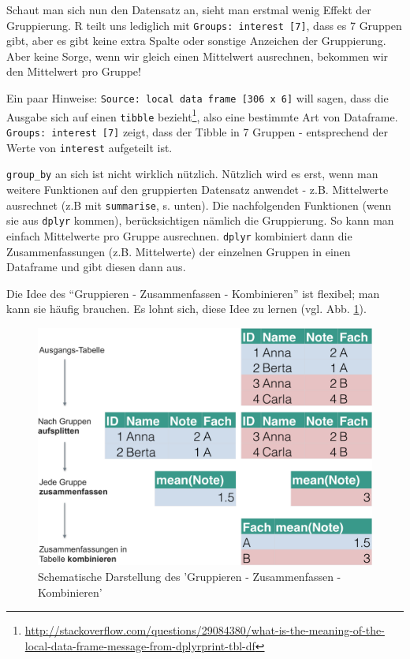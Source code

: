 \documentclass[12pt,ngerman,]{book}
\let\rmarkdownfootnote\footnote%
\def\footnote{\protect\rmarkdownfootnote}
\begin{document}
Schaut man sich nun den Datensatz an, sieht man erstmal wenig Effekt der
Gruppierung. R teilt uns lediglich mit
\texttt{Groups:\ interest\ {[}7{]}}, dass es 7 Gruppen gibt, aber es
gibt keine extra Spalte oder sonstige Anzeichen der Gruppierung. Aber
keine Sorge, wenn wir gleich einen Mittelwert ausrechnen, bekommen wir
den Mittelwert pro Gruppe!

Ein paar Hinweise: \texttt{Source:\ local\ data\ frame\ {[}306\ x\ 6{]}}
will sagen, dass die Ausgabe sich auf einen \texttt{tibble}
bezieht\footnote{\url{http://stackoverflow.com/questions/29084380/what-is-the-meaning-of-the-local-data-frame-message-from-dplyrprint-tbl-df}},
also eine bestimmte Art von Dataframe.
\texttt{Groups:\ interest\ {[}7{]}} zeigt, dass der Tibble in 7 Gruppen
- entsprechend der Werte von \texttt{interest} aufgeteilt ist.

\texttt{group\_by} an sich ist nicht wirklich nützlich. Nützlich wird es
erst, wenn man weitere Funktionen auf den gruppierten Datensatz anwendet
- z.B. Mittelwerte ausrechnet (z.B mit \texttt{summarise}, s. unten).
Die nachfolgenden Funktionen (wenn sie aus \texttt{dplyr} kommen),
berücksichtigen nämlich die Gruppierung. So kann man einfach Mittelwerte
pro Gruppe ausrechnen. \texttt{dplyr} kombiniert dann die
Zusammenfassungen (z.B. Mittelwerte) der einzelnen Gruppen in einen
Dataframe und gibt diesen dann aus.

Die Idee des ``Gruppieren - Zusammenfassen - Kombinieren'' ist flexibel;
man kann sie häufig brauchen. Es lohnt sich, diese Idee zu lernen (vgl.
Abb. \ref{fig:sac}).

\begin{figure}

{\centering \includegraphics[width=0.7\linewidth]{images/sac_crop} 

}

\caption{Schematische Darstellung des 'Gruppieren - Zusammenfassen - Kombinieren'}\label{fig:sac}
\end{figure}
\end{document}
